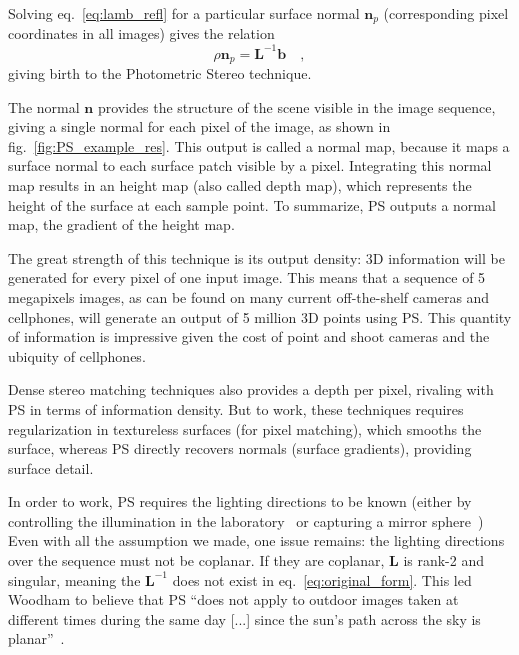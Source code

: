 Solving eq.~\eqref{eq:lamb_refl} for a particular surface normal $\mathbf{n}_p$ (corresponding pixel coordinates in all images) gives the relation
\begin{equation}
\label{eq:original_form}
\rho \mathbf{n}_p =  \mathbf{L}^{-1} \mathbf{b} \quad,
\end{equation}
giving birth to the Photometric Stereo technique.

The normal $\mathbf{n}$ provides the structure of the scene visible in the image sequence, giving a single normal for each pixel of the image, as shown in fig.~\ref{fig:PS_example_res}. This output is called a normal map, because it maps a surface normal to each surface patch visible by a pixel. Integrating this normal map results in an height map (also called depth map), which represents the height of the surface at each sample point. To summarize, PS outputs a normal map, the gradient of the height map.

The great strength of this technique is its output density: 3D information will be generated for every pixel of one input image. This means that a sequence of 5 megapixels images, as can be found on many current off-the-shelf cameras and cellphones, will generate an output of 5 million 3D points using PS. This quantity of information is impressive given the cost of point and shoot cameras and the ubiquity of cellphones.

Dense stereo matching techniques also provides a depth per pixel, rivaling with PS in terms of information density. But to work, these techniques requires regularization in textureless surfaces (for pixel matching), which smooths the surface, whereas PS directly recovers normals (surface gradients), providing surface detail.

In order to work, PS requires the lighting directions to be known (either by controlling the illumination in the laboratory~\cite{Woodham1979,Ikeuchi1981} or capturing a mirror sphere~\cite{inose-tcva-13,hung-wacv-15,ikehata-cvpr-14,oxholm-eccv-12,ikehata-cvpr-12,shi-cvpr-10,yu-iccp-13,shi-3dv-14}) Even with all the assumption we made, one issue remains: the lighting directions over the sequence must not be coplanar. If they are coplanar, $\mathbf{L}$ is rank-2 and singular, meaning the $\mathbf{L}^{-1}$ does not exist in eq.~\ref{eq:original_form}. This led Woodham to believe that PS ``does not apply to outdoor images taken at different times during the same day [...] since the sun's path across the sky is planar''~\cite{Woodham1979}.

